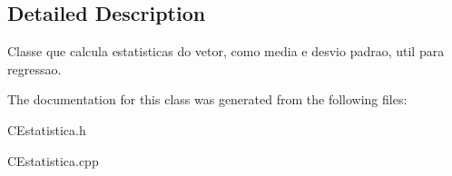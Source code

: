 \subsection{Detailed Description}
Classe que calcula estatisticas do vetor, como media e desvio padrao, util para regressao. 

The documentation for this class was generated from the following files\-:\begin{DoxyCompactItemize}
\item 
C\-Estatistica.\-h\item 
C\-Estatistica.\-cpp\end{DoxyCompactItemize}
